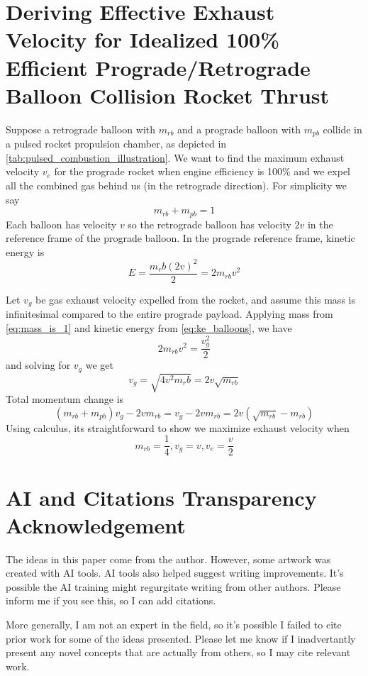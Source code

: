 \documentclass{article}
\begin{document}
\section{Deriving Effective Exhaust Velocity for Idealized 100\% Efficient Prograde/Retrograde Balloon Collision Rocket Thrust}\label{sec:dv_effective}
Suppose a retrograde balloon with $m_{rb}$ and a prograde balloon with $m_{pb}$ collide in a pulsed rocket propulsion chamber, as depicted in \autoref{tab:pulsed_combustion_illustration}.  We want to find the maximum exhaust velocity $v_e$ for the prograde rocket  when engine efficiency is 100\% and we expel all the combined gas behind us (in the retrograde direction).   For simplicity we say 
\begin{equation}
m_{rb} + m_{pb} = 1\label{eq:mass_is_1}
\end{equation} 
Each balloon has velocity $v$ so the retrograde balloon has velocity $2v$ in the reference frame of the prograde balloon.   In the prograde reference frame, kinetic energy is
\begin{equation}
E = \frac{m_rb (2v)^2}{2} = 2m_{rb}v^2\label{eq:ke_balloons}
\end{equation}

Let $v_g$ be gas exhaust velocity expelled from the rocket, and assume this mass is infinitesimal compared to the entire prograde payload.  Applying mass from \autoref{eq:mass_is_1}
 and kinetic energy from \autoref{eq:ke_balloons}, we have 
 \begin{equation}
 2m_{rb}v^2= \frac{v_g^2}{2}
 \end{equation}
 and solving for $v_g$ we get 
 \begin{equation}
 v_g = \sqrt{4v^2m_rb} = 2v\sqrt{m_{rb}} \label{eq:vg_result}
 \end{equation}
 Total momentum change is 
 \[(m_{rb} + m_{pb})v_g - 2vm_{rb} = v_g-2vm_{rb} = 2v(\sqrt{m_{rb}} - m_{rb}) \]
 Using calculus, its straightforward to show we maximize exhaust velocity when 
 \begin{equation}
 m_{rb} = \frac{1}{4}, \label{eq:max_m_rb}
 v_g = v,
 v_e= \frac{v}{2}
 \end{equation}

 \section{AI and Citations Transparency Acknowledgement}
 The ideas in this paper come from the author.  However, some artwork was created with AI tools.  AI tools also helped suggest writing improvements.  It's possible the AI training might regurgitate writing from other authors.   Please inform me if you see this, so I can add citations.  

 More generally, I am not an expert in the field, so it's possible I failed to cite prior work for some of the ideas presented.   Please let me know if I inadvertantly present any novel concepts that are actually from others, so I may cite relevant work.
 
  
  
\end{document}
